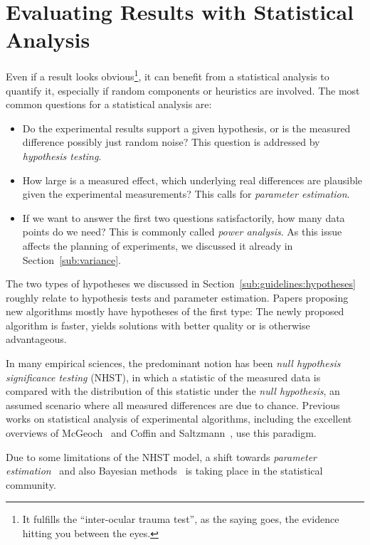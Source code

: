 \documentclass[algorithms,article,submit,moreauthors,pdftex]{Definitions/mdpi}
\newcounter{guideline}
\begin{document}
\section{Evaluating Results with Statistical Analysis}
\label{sec:statistical-analysis}
Even if a result looks obvious\footnote{It fulfills the ``inter-ocular trauma test'', as the saying goes, the evidence hitting you between the eyes.}, it can benefit from a statistical analysis to quantify it, especially if random components or heuristics are involved.
%
The most common questions for a statistical analysis are:
\begin{itemize}
\item Do the experimental results support a given hypothesis, or is the measured difference possibly just random noise? This question is addressed by \emph{hypothesis testing}.
\item How large is a measured effect, \ie which underlying real differences are plausible given the experimental measurements? This calls for \emph{parameter estimation}.
\item If we want to answer the first two questions satisfactorily, how many data points do we need? This is commonly called \emph{power analysis}.
As this issue affects the planning of experiments, we discussed it already in Section~\ref{sub:variance}.
\end{itemize}

The two types of hypotheses we discussed in Section~\ref{sub:guidelines:hypotheses} roughly relate to hypothesis tests and parameter estimation.
Papers proposing new algorithms mostly have hypotheses of the first type: The newly proposed algorithm is faster, yields solutions with better quality or is otherwise advantageous.

In many empirical sciences, the predominant notion has been \emph{null hypothesis significance testing} (NHST),
in which a statistic of the measured data is compared with the distribution of this statistic under the \emph{null hypothesis}, an assumed scenario where all measured differences are due to chance.
Previous works on statistical analysis of experimental algorithms, including the excellent overviews of McGeoch~\cite{McGeoch12} and Coffin and Saltzmann~\cite{Coffin00}, use this paradigm.

Due to some limitations of the NHST model, a shift towards \emph{parameter estimation}~\cite{anderson2000null,doi:10.1080/01973533.2015.1012991,wasserstein2016asa,lash2017harm} and also Bayesian methods~\cite{doi:10.1177/0956797613504966,kruschke2018bayesian,murtaugh2014defense} is taking place in the statistical community.
\end{document}
